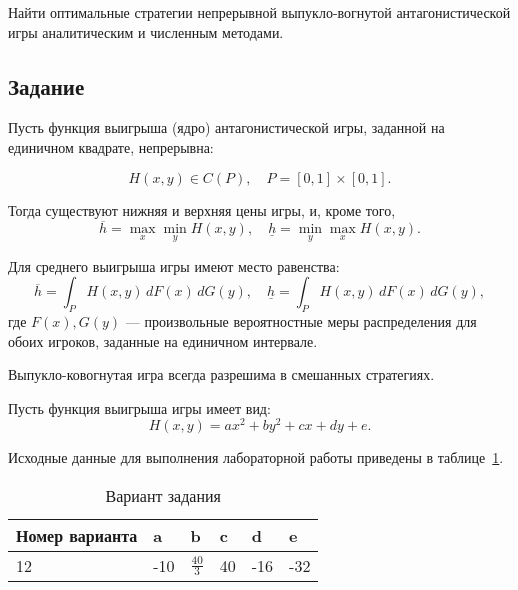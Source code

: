 
Найти оптимальные стратегии непрерывной выпукло-вогнутой антагонистической игры
аналитическим и численным методами.

\subsection*{Задание}

Пусть функция выигрыша (ядро) антагонистической игры, заданной на единичном квадрате,
непрерывна:

\[
H(x,y) \in C(P), \quad P = [0,1] \times [0,1].
\]

Тогда существуют нижняя и верхняя цены игры, и, кроме того,
\[
\overline{h} = \max_{x} \min_{y} H(x,y), 
\quad
\underline{h} = \min_{y} \max_{x} H(x,y).
\]

Для среднего выигрыша игры имеют место равенства:
\[
\overline{h} = \int_{P} H(x,y)\, dF(x)\,dG(y), 
\quad
\underline{h} = \int_{P} H(x,y)\, dF(x)\,dG(y),
\]
где \(F(x), G(y)\) --- произвольные вероятностные меры распределения для обоих игроков,
заданные на единичном интервале.

Выпукло-ковогнутая игра всегда разрешима в смешанных стратегиях.

Пусть функция выигрыша игры имеет вид:
\[
H(x,y) = ax^2 + by^2 + cx + dy + e.
\]

Исходные данные для выполнения лабораторной работы приведены в таблице~\ref{tab:tab1}.

\begin{table}[h]
  \centering
  \caption{Вариант задания}
  \begin{tabularx}{\textwidth}{|X|X|X|X|X|X|}
    \hline
    \textbf{Номер варианта} & \textbf{a} & \textbf{b} & \textbf{c} & \textbf{d} & \textbf{e} \\ \hline
    12 & -10 & \(\frac{40}{3}\) & 40 & -16 & -32 \\ \hline
  \end{tabularx}
  \label{tab:tab1}
\end{table}
